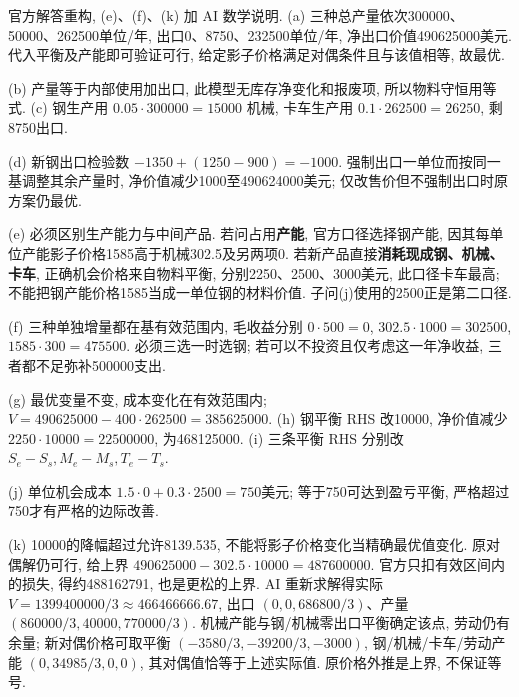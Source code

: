 \begin{solution}
官方解答重构, (e)、(f)、(k) 加 AI 数学说明. (a) 三种总产量依次300000、50000、262500单位/年, 出口0、8750、232500单位/年, 净出口价值490625000美元. 代入平衡及产能即可验证可行, 给定影子价格满足对偶条件且与该值相等, 故最优.

(b) 产量等于内部使用加出口, 此模型无库存净变化和报废项, 所以物料守恒用等式. (c) 钢生产用 $0.05\cdot300000=15000$ 机械, 卡车生产用 $0.1\cdot262500=26250$, 剩8750出口.

(d) 新钢出口检验数 $-1350+(1250-900)=-1000$. 强制出口一单位而按同一基调整其余产量时, 净价值减少1000至490624000美元; 仅改售价但不强制出口时原方案仍最优.

(e) 必须区别生产能力与中间产品. 若问占用\textbf{产能}, 官方口径选择钢产能, 因其每单位产能影子价格1585高于机械302.5及另两项0. 若新产品直接\textbf{消耗现成钢、机械、卡车}, 正确机会价格来自物料平衡, 分别2250、2500、3000美元, 此口径卡车最高; 不能把钢产能价格1585当成一单位钢的材料价值. 子问(j)使用的2500正是第二口径.

(f) 三种单独增量都在基有效范围内, 毛收益分别 $0\cdot500=0$, $302.5\cdot1000=302500$, $1585\cdot300=475500$. 必须三选一时选钢; 若可以不投资且仅考虑这一年净收益, 三者都不足弥补500000支出.

(g) 最优变量不变, 成本变化在有效范围内; $V=490625000-400\cdot262500=385625000$. (h) 钢平衡 RHS 改10000, 净价值减少 $2250\cdot10000=22500000$, 为468125000. (i) 三条平衡 RHS 分别改 $S_e-S_s,M_e-M_s,T_e-T_s$.

(j) 单位机会成本 $1.5\cdot0+0.3\cdot2500=750$美元; 等于750可达到盈亏平衡, 严格超过750才有严格的边际改善.

(k) 10000的降幅超过允许8139.535, 不能将影子价格变化当精确最优值变化. 原对偶解仍可行, 给上界 $490625000-302.5\cdot10000=487600000$. 官方只扣有效区间内的损失, 得约488162791, 也是更松的上界. AI 重新求解得实际 $V=1399400000/3\approx466466666.67$, 出口 $(0,0,686800/3)$、产量 $(860000/3,40000,770000/3)$. 机械产能与钢/机械零出口平衡确定该点, 劳动仍有余量; 新对偶价格可取平衡 $(-3580/3,-39200/3,-3000)$, 钢/机械/卡车/劳动产能 $(0,34985/3,0,0)$, 其对偶值恰等于上述实际值. 原价格外推是上界, 不保证等号.
\end{solution}

